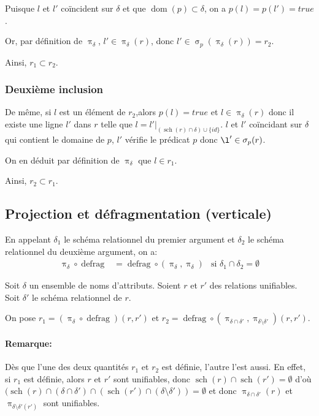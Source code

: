 \documentclass[french]{article}
\DeclareMathOperator{\proj}{\pi}
\DeclareMathOperator{\sel}{\sigma}
\DeclareMathOperator{\defrag}{defrag}
\DeclareMathOperator{\dom}{dom}
\DeclareMathOperator{\s}{sch}
\newcommand{\projDelta}{\proj_{\delta}}
\newcommand{\selP}{\sel_p}
\newcommand{\cip}{\cup \{id\}}
\newcommand{\dintro}{De même, si $l$ est un élément de $r_2$,}
\begin{document}
Puisque $l$ et $l'$ coïncident sur $\delta$
et que $\dom(p) \subset \delta$,
on a $p(l) = p(l') = true$.

Or, par définition de $\projDelta$, $l' \in \projDelta(r)$,
donc $l' \in \selP(\projDelta(r)) = r_2$.

Ainsi,
$r_1 \subset r_2$.

\subsubsection*{Deuxième inclusion}
\dintro alors $p(l) = true$ et $l \in \projDelta(r)$
donc il existe une ligne $l'$ dans $r$ telle que 
$l = l'|_{(\s(r)\cap \delta) \cip}$.
$l$ et $l'$ coïncidant sur $\delta$ qui contient
le domaine de $p$, $l'$ vérifie le prédicat $p$
donc $\l' \in \selP(r)$.

On en déduit par définition de $\projDelta$ que
$l \in r_1$.

Ainsi, $r_2 \subset r_1$.

\subsection*{Projection et défragmentation (verticale)}
En appelant $\delta_1$ le schéma relationnel du premier
argument et $\delta_2$ le schéma relationnel du deuxième
argument, on a:
\begin{align}
\projDelta \circ \defrag
& = \defrag \circ (\projDelta, \projDelta)
& \text{si $\delta_1 \cap \delta_2 = \emptyset$}
\end{align}

Soit $\delta$ un ensemble de noms d'attributs.
Soient $r$ et $r'$ des relations unifiables.
Soit $\delta'$ le schéma relationnel de $r$.

On pose $r_1 = (\projDelta \circ \defrag) (r, r')$
et $r_2 = \defrag \circ (\proj_{\delta \cap \delta'}, \proj_{\delta \setminus \delta'}) (r, r')$.

\paragraph*{Remarque:}
Dès que l'une des deux quantités $r_1$ et $r_2$ est définie, l'autre l'est aussi.
En effet, si $r_1$ est définie, alors $r$ et $r'$ sont unifiables,
donc $\s(r) \cap \s(r') = \emptyset$ d'où
$ (\s(r) \cap (\delta \cap \delta') \cap (\s(r') \cap (\delta \setminus \delta')) = \emptyset $
et donc $\proj_{\delta \cap \delta'}(r)$ et $\proj_{\delta \setminus \delta'(r')}$ sont unifiables.
\end{document}
